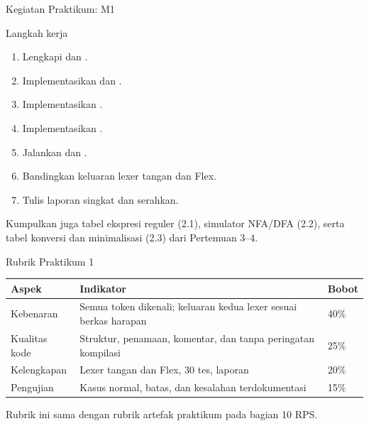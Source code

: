 \documentclass[aspectratio=169,10pt,t]{beamer}
\begin{document}
\begin{frame}{Kegiatan Praktikum: M1}
  \begin{block}{Langkah kerja}
    \footnotesize
    \begin{enumerate}
      \setlength{\itemsep}{1pt}
      \item Lengkapi  dan .
      \item Implementasikan  dan .
      \item Implementasikan .
      \item Implementasikan .
      \item Jalankan  dan .
      \item Bandingkan keluaran lexer tangan dan Flex.
      \item Tulis laporan singkat dan serahkan.
    \end{enumerate}
  \end{block}

  \vspace{2pt}
  {\footnotesize\color{ubbblue!80}Kumpulkan juga tabel ekspresi reguler
  (2.1), simulator NFA/DFA (2.2), serta tabel konversi dan minimalisasi
  (2.3) dari Pertemuan 3--4.}
\end{frame}

\begin{frame}{Rubrik Praktikum 1}
  \small
  \setlength{\tabcolsep}{4pt}
  \begin{tabular}{@{}p{3.4cm}p{8.6cm}p{1.8cm}@{}}
    \toprule
    \textbf{Aspek} & \textbf{Indikator} & \textbf{Bobot} \\
    \midrule
    Kebenaran & Semua token dikenali; keluaran kedua lexer sesuai
      berkas harapan & 40\% \\
    Kualitas kode & Struktur, penamaan, komentar, dan tanpa peringatan
      kompilasi & 25\% \\
    Kelengkapan & Lexer tangan dan Flex, 30 tes, laporan & 20\% \\
    Pengujian & Kasus normal, batas, dan kesalahan terdokumentasi &
      15\% \\
    \bottomrule
  \end{tabular}

  \vspace{5pt}
  {\footnotesize\color{ubbblue!80}Rubrik ini sama dengan rubrik artefak
  praktikum pada bagian 10 RPS.}
\end{frame}
\end{document}
